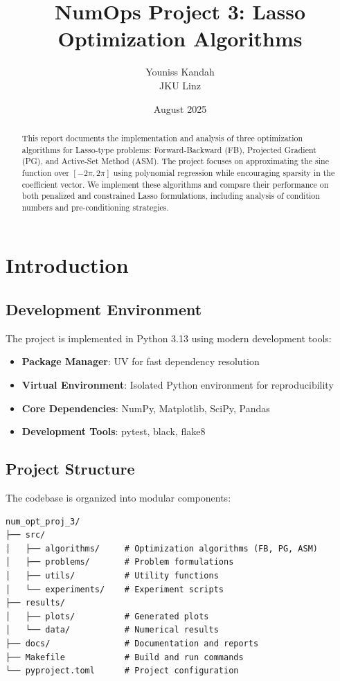 \documentclass[11pt,a4paper]{article}
\title{NumOps Project 3: Lasso Optimization Algorithms}
\author{Youniss Kandah\\JKU Linz}
\date{August 2025}
\begin{document}
\maketitle

\begin{abstract}
This report documents the implementation and analysis of three optimization algorithms for Lasso-type problems: Forward-Backward (FB), Projected Gradient (PG), and Active-Set Method (ASM). The project focuses on approximating the sine function over $[-2\pi, 2\pi]$ using polynomial regression while encouraging sparsity in the coefficient vector. We implement these algorithms and compare their performance on both penalized and constrained Lasso formulations, including analysis of condition numbers and pre-conditioning strategies.
\end{abstract}

\tableofcontents
\newpage

\section{Introduction}

\subsection{Development Environment}

The project is implemented in Python 3.13 using modern development tools:

\begin{itemize}
    \item \textbf{Package Manager}: UV for fast dependency resolution
    \item \textbf{Virtual Environment}: Isolated Python environment for reproducibility
    \item \textbf{Core Dependencies}: NumPy, Matplotlib, SciPy, Pandas
    \item \textbf{Development Tools}: pytest, black, flake8
\end{itemize}

\subsection{Project Structure}

The codebase is organized into modular components:

\begin{verbatim}
num_opt_proj_3/
├── src/
│   ├── algorithms/     # Optimization algorithms (FB, PG, ASM)
│   ├── problems/       # Problem formulations
│   ├── utils/          # Utility functions
│   └── experiments/    # Experiment scripts
├── results/
│   ├── plots/          # Generated plots
│   └── data/           # Numerical results
├── docs/               # Documentation and reports
├── Makefile            # Build and run commands
└── pyproject.toml      # Project configuration
\end{verbatim}
\end{document}

